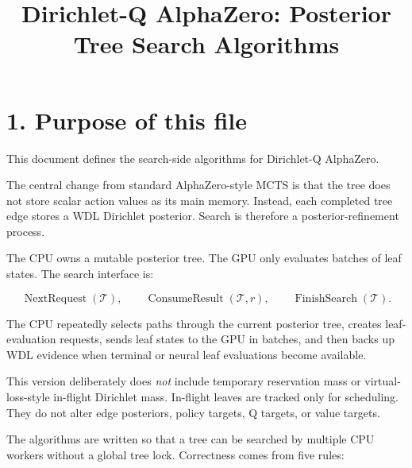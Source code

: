 \documentclass[11pt]{article}
\title{Dirichlet-Q AlphaZero: Posterior Tree Search Algorithms}
\author{}
\date{}
\newcommand{\Tree}{\mathcal{T}}
\newcommand{\NextRequest}{\operatorname{NextRequest}}
\newcommand{\ConsumeResult}{\operatorname{ConsumeResult}}
\newcommand{\FinishSearch}{\operatorname{FinishSearch}}
\begin{document}
\maketitle


\section*{1. Purpose of this file}

This document defines the search-side algorithms for Dirichlet-Q AlphaZero.

The central change from standard AlphaZero-style MCTS is that the tree does not
store scalar action values as its main memory. Instead, each completed tree edge
stores a WDL Dirichlet posterior. Search is therefore a posterior-refinement
process.

The CPU owns a mutable posterior tree. The GPU only evaluates batches of leaf
states. The search interface is:

\[
\NextRequest(\Tree),
\qquad
\ConsumeResult(\Tree,r),
\qquad
\FinishSearch(\Tree).
\]

The CPU repeatedly selects paths through the current posterior tree, creates
leaf-evaluation requests, sends leaf states to the GPU in batches, and then backs
up WDL evidence when terminal or neural leaf evaluations become available.

This version deliberately does \emph{not} include temporary reservation mass or
virtual-loss-style in-flight Dirichlet mass. In-flight leaves are tracked only
for scheduling. They do not alter edge posteriors, policy targets, Q targets, or
value targets.

The algorithms are written so that a tree can be searched by multiple CPU
workers without a global tree lock. Correctness comes from five rules:
\end{document}
